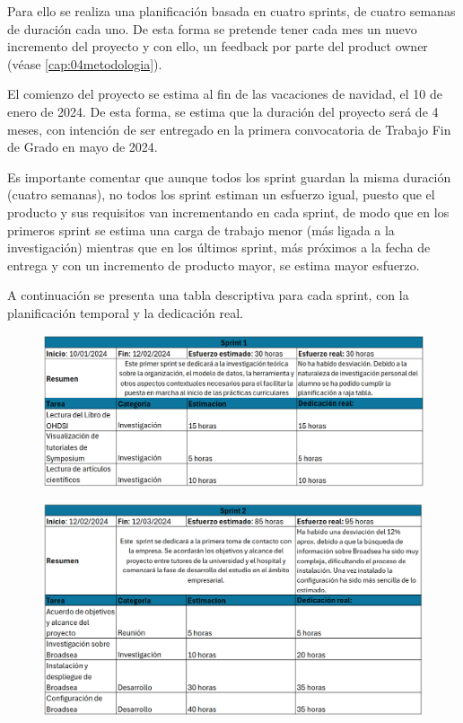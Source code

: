 Para ello se realiza una planificación basada en cuatro sprints, de cuatro semanas de duración cada uno. De esta forma se pretende tener cada mes un nuevo incremento del proyecto y con ello, un feedback por parte del product owner (véase \ref{cap:04metodologia}). 

El comienzo del proyecto se estima al fin de las vacaciones de navidad, el 10 de enero de 2024. De esta forma, se estima que la duración del proyecto será de 4 meses, con intención de ser entregado en la primera convocatoria de Trabajo Fin de Grado en mayo de 2024.

Es importante comentar que aunque todos los sprint guardan la misma duración (cuatro semanas), no todos los sprint estiman un esfuerzo igual, puesto que el producto y sus requisitos van incrementando en cada sprint, de modo que en los primeros sprint se estima una carga de trabajo menor (más ligada a la investigación) mientras que en los últimos sprint, más próximos a la fecha de entrega y con un incremento de producto mayor, se estima mayor esfuerzo.

A continuación se presenta una tabla descriptiva para cada sprint, con la planificación temporal y la dedicación real. 

\begin{figure}[H]
    \centering
    \includegraphics[width=1\textwidth]{tables/sprint1cap.png}
    \label{table:sprint1cap}
\end{figure}

\begin{figure}[H]
    \centering
    \includegraphics[width=1\textwidth]{tables/sprint2cap.png}
    \label{table:sprint2cap}
\end{figure}

